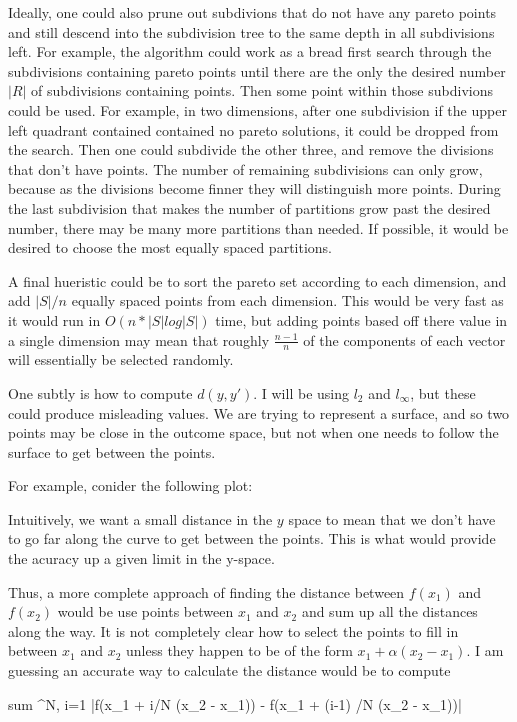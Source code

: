 {{Ideally, one could also prune out subdivions that do not have any pareto points and still descend into the subdivision tree to the same depth in all subdivisions left.
For example, the algorithm could work as a bread first search through the subdivisions containing pareto points until there are the only the desired number $|R|$ of subdivisions containing points.
Then some point within those subdivions could be used.
For example, in two dimensions, after one subdivision if the upper left quadrant contained contained no pareto solutions, it could be dropped from the search.
Then one could subdivide the other three, and remove the divisions that don't have points.
The number of remaining subdivisions can only grow, because as the divisions become finner they will distinguish more points.
During the last subdivision that makes the number of partitions grow past the desired number, there may be many more partitions than needed.
If possible, it would be desired to choose the most equally spaced partitions.

A final hueristic could be to sort the pareto set according to each dimension, and add $|S| / n$ equally spaced points from each dimension.
This would be very fast as it would run in $O(n * |S| log |S|)$ time, but adding points based off there value in a single dimension may mean that roughly $\frac {n-1}n$ of the 
components of each vector will essentially be selected randomly.


One subtly is how to compute $d(y, y')$. I will be using $l_2$ and $l_{\infty}$, but these could produce misleading values.
We are trying to represent a surface, and so two points may be close in the outcome space, but not when one needs to follow the surface to get between the points.

For example, conider the following plot:

Intuitively, we want a small distance in the $y$ space to mean that we don't have to go far along the curve to get between the points.
This is what would provide the acuracy up a given limit in the y-space.

Thus, a more complete approach of finding the distance between $f(x_1)$ and $f(x_2)$ would be use points between $x_1$ and $x_2$ and sum up all the distances along the way.
It is not completely clear how to select the points to fill in between $x_1$ and $x_2$ unless they happen to be of the form $x_1 + \alpha (x_2 - x_1)$.
I am guessing an accurate way to calculate the distance would be to compute 

sum ^N, i=1   |f(x_1 + i/N (x_2 - x_1)) - f(x_1 + (i-1) /N (x_2 - x_1))| 

}}
